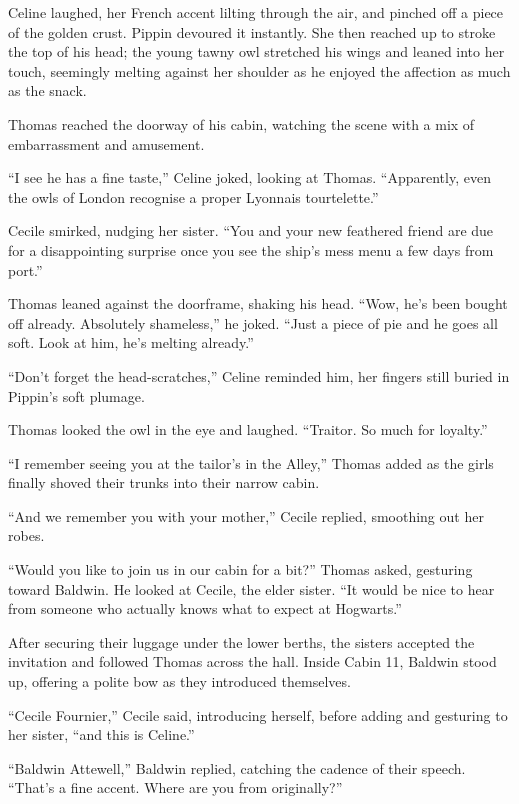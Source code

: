 Celine laughed, her French accent lilting through the air, and pinched off a piece of the golden crust. Pippin devoured it instantly. She then reached up to stroke the top of his head; the young tawny owl stretched his wings and leaned into her touch, seemingly melting against her shoulder as he enjoyed the affection as much as the snack.

Thomas reached the doorway of his cabin, watching the scene with a mix of embarrassment and amusement.

\enquote{I see he has a fine taste,} Celine joked, looking at Thomas. \enquote{Apparently, even the owls of London recognise a proper Lyonnais tourtelette.}

Cecile smirked, nudging her sister. \enquote{You and your new feathered friend are due for a disappointing surprise once you see the ship's mess menu a few days from port.}

Thomas leaned against the doorframe, shaking his head. \enquote{Wow, he's been bought off already. Absolutely shameless,} he joked. \enquote{Just a piece of pie and he goes all soft. Look at him, he's melting already.}

\enquote{Don't forget the head-scratches,} Celine reminded him, her fingers still buried in Pippin's soft plumage.

Thomas looked the owl in the eye and laughed. \enquote{Traitor. So much for loyalty.}

\enquote{I remember seeing you at the tailor's in the Alley,} Thomas added as the girls finally shoved their trunks into their narrow cabin.

\enquote{And we remember you with your mother,} Cecile replied, smoothing out her robes.

\enquote{Would you like to join us in our cabin for a bit?} Thomas asked, gesturing toward Baldwin. He looked at Cecile, the elder sister. \enquote{It would be nice to hear from someone who actually knows what to expect at Hogwarts.}

After securing their luggage under the lower berths, the sisters accepted the invitation and followed Thomas across the hall. Inside Cabin 11, Baldwin stood up, offering a polite bow as they introduced themselves.

\enquote{Cecile Fournier,} Cecile said, introducing herself, before adding and gesturing to her sister, \enquote{and this is Celine.}

\enquote{Baldwin Attewell,} Baldwin replied, catching the cadence of their speech. \enquote{That's a fine accent. Where are you from originally?}

